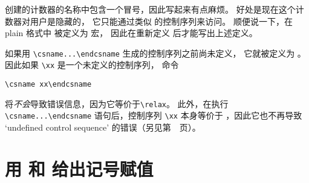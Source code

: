 \documentclass[letterpaper]{book}
\begin{document}
 创建的计数器的名称中包含一个冒号，因此写起来有点麻烦。
好处是现在这个计数器对用户是隐藏的，
它只能通过类似  的控制序列来访问。
顺便说一下，在 plain 格式中  被定义为  宏，
因此在重新定义  后才能写出上述定义。

如果用 \verb>\csname...\endcsname> 生成的控制序列之前尚未定义，
它就被定义为 。因此如果 \verb=\xx= 是一个未定义的控制序列，
命令
\begin{verbatim}
\csname xx\endcsname
\end{verbatim}
将{\em 不会}导致错误信息，因为它等价于\verb=\relax=。
此外，在执行 \verb-\csname...\endcsname- 语句后，控制序列
\verb=\xx= 本身等价于 ，因此它也不再导致
`undefined control sequence' 的错误（另见第~\pageref{relax:cs}~页）。


\section{用 \protect{} 和 \protect{} 给出记号赋值}
\end{document}
